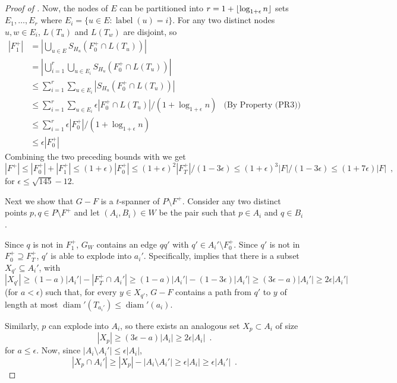 \documentclass{patmorin}
\DeclareMathOperator{\diam}{diam}
\DeclareMathOperator{\lbl}{label}
\begin{document}
\begin{proof}[Proof of ]
  Now, the nodes of $E$ can be partitioned into
  $r=1+{\lfloor \log_{1+\epsilon} n \rfloor}$ sets $E_1,\ldots,E_r$ where $E_i =
  \{u \in E :\lbl(u)=i\}$.  For any two distinct nodes $u,w\in E_i$,
  $L(T_u)$ and $L(T_w)$ are disjoint, so
  \begin{align*}
     |F^+_1| 
     & = \left|\bigcup_{u\in E} S_{H_u}(F^+_0\cap L(T_u))\right| \\
     & = \left|\bigcup_{i=1}^r\bigcup_{u\in E_i} S_{H_u}(F^+_0\cap L(T_u))\right| \\
     & \le \sum_{i=1}^r\sum_{u\in E_i} |S_{H_u}(F^+_0\cap L(T_u))| \\
     & \le \sum_{i=1}^r\sum_{u\in E_i} \epsilon|F^+_0\cap L(T_u)|/(1+\log_{1+\epsilon} n) & \text{(By Property~(PR3))} \\
     & \le \sum_{i=1}^r \epsilon|F^+_0|/(1+\log_{1+\epsilon} n) \\
     & \le \epsilon|F^+_0|
  \end{align*}
  Combining the two preceding bounds with  we get
  \[
      |F^+|\le |F^+_0|+|F^+_1|
      \le (1+\epsilon)|F^+_0|
      \le (1+\epsilon)^2|F^+_T|/(1-3\epsilon)
      \le (1+\epsilon)^3|F|/(1-3\epsilon)
      \le (1+7\epsilon)|F| \enspace ,
  \]
  for $\epsilon \le \sqrt{145}-12$.

  Next we show that $G-F$ is a $t$-spanner of $P\setminus F^+$.
  Consider any two distinct points $p,q\in P\setminus F^+$ and
  let $(A_i,B_i)\in W$ be the pair such that $p\in A_i$ and $q\in B_i$.


  Since $q$ is not in $F^+_1$, $G_W$ contains an edge $qq'$ with $q'\in
  A_i'\setminus F^+_0$.
  Since $q'$ is not in $F^+_0\supseteq F^+_T$, $q'$ is able to explode
  into $a_i'$.  Specifically,  implies that there is
  a subset $X_{q'}\subseteq A_i'$, with
  \[  |X_{q'}|\ge (1-a)|A_i'| - |F^+_T\cap A_i'| 
        \ge (1-a)|A_i'| - (1-3\epsilon)|A_i'| 
        \ge (3\epsilon-a)|A_i'| \ge 2\epsilon|A_i'|
  \] 
  (for $a < \epsilon$)
  such that, for every $y\in X_{q'}$, $G-F$ contains a path from $q'$ to $y$
  of length at most $\diam'(T_{a_i'})\le \diam'(a_i)$.

  Similarly, $p$ can explode into $A_i$, so there exists an analogous
  set $X_p\subset A_i$ of size \[  |X_p| \ge (3\epsilon-a)|A_i|
  \ge 2\epsilon|A_i| \enspace .  \] for $a\le\epsilon$.  Now,
  since $|A_i\setminus A_i'|\le \epsilon |A_i|$, 
  \[ |X_p\cap A_i'|\ge |X_p|-|A_i\setminus A_i'|\ge \epsilon|A_i| \ge \epsilon|A_i'| \enspace . \]


\end{proof}
\end{document}
